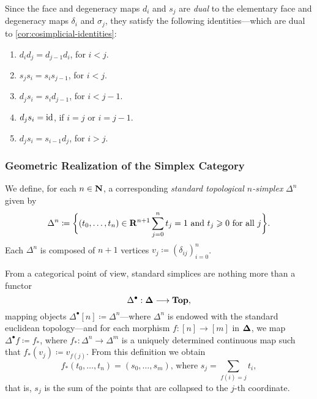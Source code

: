 \begin{corollary}
\label{cor:simplicial-identities}
Since the face and degeneracy maps \(d_i\) and \(s_j\) are \emph{dual} to the
elementary face and degeneracy maps \(\delta_i\) and \(\sigma_j\), they satisfy
the following identities---which are dual to \cref{cor:cosimplicial-identities}:
\begin{enumerate}[(1)]\setlength\itemsep{0em}
\item \(d_i d_j = d_{j-1} d_i\), for \(i < j\).
\item \(s_j s_i = s_i s_{j-1}\), for \(i < j\).
\item \(d_j s_i = s_i d_{j-1}\), for \(i < j-1\).
\item \(d_j s_i = \operatorname{id}\), if \(i = j\) or \(i = j-1\).
\item \(d_j s_i = s_{i-1} d_j\), for \(i > j\).
\end{enumerate}
\end{corollary}

\subsubsection{Geometric Realization of the Simplex Category}

We define, for each \(n \in \mathbf{N}\), a corresponding \emph{standard topological
  \(n\)-simplex} \(\Delta^n\) given by
\[
\Delta^n \coloneq \bigg\{(t_0, \dots, t_n) \in \mathbf{R}^{n+1} \relax \sum_{j=0}^n t_j = 1
\text{ and } t_j \geqslant 0 \text{ for all } j
\bigg\}.
\]
Each \(\Delta^n\) is composed of \(n+1\) vertices
\(v_j \coloneq (\delta_{ij})_{i=0}^n\).

From a categorical point of view, standard simplices are nothing more than a functor
\[
\Delta^{\bullet}: {\mathbf{\Delta}} \longrightarrow {\textbf{Top}},
\]
mapping objects \(\Delta^{\bullet}[n] \coloneq \Delta^n\)---where \(\Delta^n\)
is endowed with the standard euclidean topology---and for each
morphism \(f: [n] \to [m]\) in \({\mathbf{\Delta}}\), we map
\(\Delta^{\bullet} f \coloneq f_{*}\), where \(f_{*}: \Delta^n \to \Delta^m\) is
a uniquely determined continuous map such that
\(f_{*}(v_j) \coloneq v_{f(j)}\). From this definition we obtain
\[
f_{*}(t_0, \dots, t_n) = (s_0, \dots, s_m) \text{,\ \ where \ }
s_j = \sum_{f(i) = j} t_i,
\]
that is, \(s_j\) is the sum of the points that are collapsed to the \(j\)-th
coordinate.

